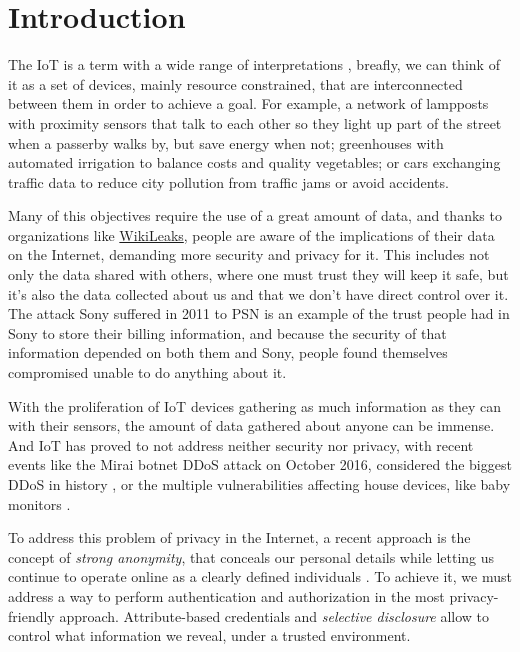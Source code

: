 \chapter{Introduction}\label{ch:introduction}

The \ac{IoT} is a term with a wide range of interpretations \citep{Atzori20102787}, breafly, we can think of it as a set of devices, mainly resource constrained, that are interconnected between them in order to achieve a goal. For example, a network of lampposts with proximity sensors that talk to each other so they light up part of the street when a passerby walks by, but save energy when not; greenhouses with automated irrigation to balance costs and quality vegetables; or cars exchanging traffic data to reduce city pollution from traffic jams or avoid accidents.

Many of this objectives require the use of a great amount of data, and thanks to organizations like \href{https://wikileaks.org/}{WikiLeaks}, people are aware of the implications of their data on the Internet, demanding more security and privacy for it. This includes not only the data shared with others, where one must trust they will keep it safe, but it's also the data collected about us and that we don't have direct control over it. The attack Sony suffered in 2011 to PSN \citep{PSN2011} is an example of the trust people had in Sony to store their billing information, and because the security of that information depended on both them and Sony, people found themselves compromised unable to do anything about it. 

With the proliferation of IoT devices gathering as much information as they can with their sensors, the amount of data gathered about anyone can be immense. And IoT has proved to not address neither security nor privacy, with recent events like the Mirai botnet DDoS attack on October 2016, considered the biggest DDoS in history \citep{jeyanthi:2017}, or the multiple vulnerabilities affecting house devices, like baby monitors \citep{rapid7babycam}.


To address this problem of privacy in the Internet, a recent approach is the concept of \textit{strong anonymity}, that conceals our personal details while letting us continue to operate online as a clearly defined individuals \citep{stronganonymity}. To achieve it, we must address a way to perform authentication and authorization in the most privacy-friendly approach. Attribute-based credentials and \textit{selective disclosure} allow to control what information we reveal, under a trusted environment.

